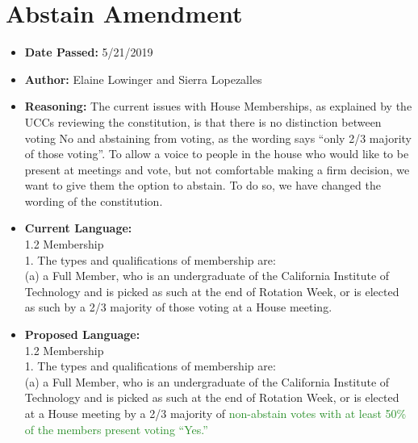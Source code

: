 \documentclass[10pt]{article} %
\begin{document}
\section{Abstain Amendment}
\begin{itemize}
	\item \textbf{Date Passed:} 5/21/2019
	\item \textbf{Author:} Elaine Lowinger and Sierra Lopezalles
	\item \textbf{Reasoning:} The current issues with House Memberships, as explained by the UCCs reviewing the constitution, is that there is no distinction between voting No and abstaining from voting, as the wording says “only 2/3 majority of those voting”. To allow a voice to people in the house who would like to be present at meetings and vote, but not comfortable making a firm decision, we want to give them the option to abstain. To do so, we have changed the wording of the constitution. 
	\item \textbf{Current Language:} \\
	1.2 Membership \\
	1. The types and qualifications of membership are: \\
	(a) a Full Member, who is an undergraduate of the California Institute of Technology and is picked as such at the end of Rotation Week, or is elected as such by a 2/3 majority of those voting at a House meeting. 
	\item \textbf{Proposed Language:} \\
	1.2 Membership \\
	1. The types and qualifications of membership are: \\
	(a) a Full Member, who is an undergraduate of the California Institute of Technology and is picked as such at the end of Rotation Week, or is elected at a House meeting by a 2/3 majority of \textcolor{ForestGreen}{non-abstain votes with at least 50\% of the members present voting “Yes.”}
\end{itemize}
\end{document}
